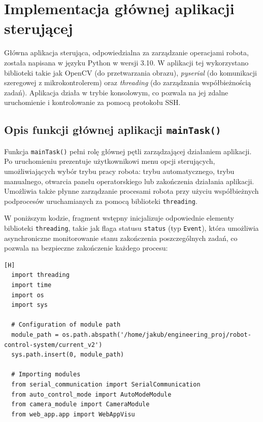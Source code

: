\section{Implementacja głównej aplikacji sterującej}

Główna aplikacja sterująca, odpowiedzialna za zarządzanie operacjami robota, została napisana w języku Python w wersji 3.10. W aplikacji tej wykorzystano biblioteki takie jak OpenCV (do przetwarzania obrazu), \textit{pyserial} (do komunikacji szeregowej z mikrokontrolerem) oraz \textit{threading} (do zarządzania współbieżnością zadań). Aplikacja działa w trybie konsolowym, co pozwala na jej zdalne uruchomienie i kontrolowanie za pomocą protokołu SSH.


\subsection{Opis funkcji głównej aplikacji \texttt{mainTask()}}

Funkcja \texttt{mainTask()} pełni rolę głównej pętli zarządzającej działaniem aplikacji. Po uruchomieniu prezentuje użytkownikowi menu opcji sterujących, umożliwiających wybór trybu pracy robota: trybu automatycznego, trybu manualnego, otwarcia panelu operatorskiego lub zakończenia działania aplikacji. Umożliwia także płynne zarządzanie procesami robota przy użyciu współbieżnych podprocesów uruchamianych za pomocą biblioteki \texttt{threading}.

W poniższym kodzie, fragment wstępny inicjalizuje odpowiednie elementy biblioteki \texttt{threading}, takie jak flaga statusu \texttt{status} (typ \texttt{Event}), która umożliwia asynchroniczne monitorowanie stanu zakończenia poszczególnych zadań, co pozwala na bezpieczne zakończenie każdego procesu:

\vspace*{0.5cm}

\begin{lstlisting}[caption=Importowanie bibliotek i modułów sterujących aplikacją, label=fig:imported_modules, captionpos=b][H]
  import threading
  import time
  import os
  import sys

  # Configuration of module path
  module_path = os.path.abspath('/home/jakub/engineering_proj/robot-control-system/current_v2')
  sys.path.insert(0, module_path)

  # Importing modules
  from serial_communication import SerialCommunication
  from auto_control_mode import AutoModeModule
  from camera_module import CameraModule
  from web_app.app import WebAppVisu
\end{lstlisting}


